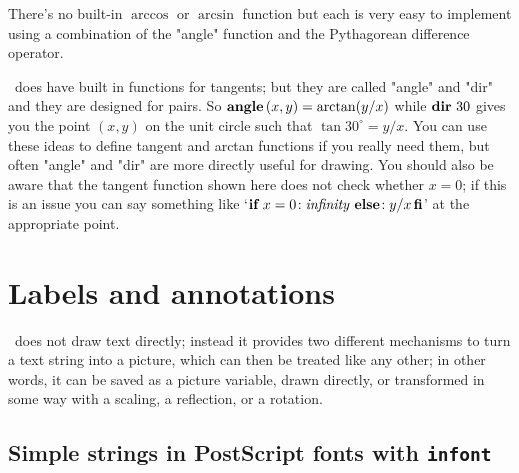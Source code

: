 \documentclass[a4paper,landscape]{article}
\def\kw#1{\begingroup\def\_{\kern.04em
    \vbox{\hrule width.3em height .6pt}\kern.08em}%
\ifmmode\mathop{\textbf{#1}}\else\hbox{\bf#1\/}\fi\endgroup}
\def\id#1{\begingroup\def\_{\kern.04em
    \vbox{\hrule width.3em height .6pt}\kern.08em}%
\ifmmode\mathop{\textit{#1}}\else\hbox{\it#1\/}\fi\endgroup}
\begin{document}
There's no built-in $\arccos$ or $\arcsin$ function but each is very easy to
implement using a combination of the "angle" function and the Pythagorean difference
operator.

\MP\ does have built in functions for tangents; but they are called "angle" and
"dir" and they are designed for pairs. So $\kw{angle}\,(x,y)=\arctan(y/x)$ while
$\kw{dir}\,30$ gives you the point $(x,y)$ on the unit circle such that $\tan
30^{\circ} = y/x$.  You can use these ideas to define tangent and arctan functions
if you really need them, but often "angle" and "dir" are more directly useful
for drawing.  You should also be aware that the tangent function shown here does not
check whether $x=0$; if this is an issue you can say something like
`$\kw{if}\,x=0\!:\id{infinity}\: \kw{else}\!: y/x \kw{fi}$' at the appropriate
point.


\newpage
\section{Labels and annotations}

\MP\ does not draw text directly; instead it provides two different mechanisms to
turn a text string into a picture, which can then be treated like any other; in
other words, it can
be saved as a picture variable, drawn directly, or transformed in some way with a
scaling, a reflection, or a rotation.

\subsection{Simple strings in PostScript fonts with \texttt{infont}}
\end{document}
